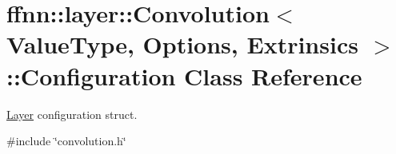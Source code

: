 \hypertarget{classffnn_1_1layer_1_1_convolution_1_1_configuration}{\section{ffnn\-:\-:layer\-:\-:Convolution$<$ Value\-Type, Options, Extrinsics $>$\-:\-:Configuration Class Reference}
\label{classffnn_1_1layer_1_1_convolution_1_1_configuration}
}


\hyperlink{classffnn_1_1layer_1_1_layer}{Layer} configuration struct.  




{\ttfamily \#include \char`\"{}convolution.\-h\char`\"{}}

